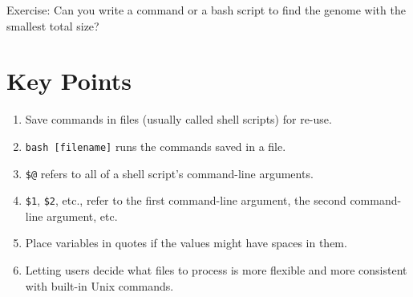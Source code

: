 \documentclass[
]{book}
\providecommand{\tightlist}{%
  \setlength{\itemsep}{0pt}\setlength{\parskip}{0pt}}
\begin{document}
Exercise: Can you write a command or a bash script to find the genome with the smallest total size?

\section{Key Points}\label{key-points-1}

\begin{enumerate}
\def\labelenumi{\arabic{enumi}.}
\tightlist
\item
  Save commands in files (usually called shell scripts) for re-use.
\item
  \texttt{bash\ {[}filename{]}} runs the commands saved in a file.
\item
  \texttt{\$@} refers to all of a shell script's command-line arguments.
\item
  \texttt{\$1}, \texttt{\$2}, etc., refer to the first command-line argument, the second command-line argument, etc.
\item
  Place variables in quotes if the values might have spaces in them.
\item
  Letting users decide what files to process is more flexible and more consistent with built-in Unix commands.
\end{enumerate}


\end{document}
